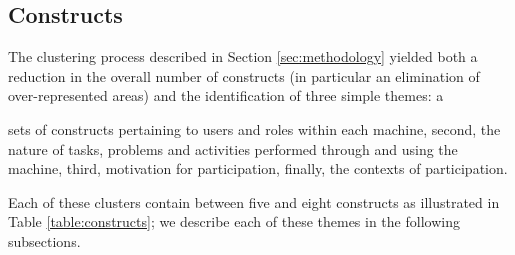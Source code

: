 \documentclass{sig-alternate}
\begin{document}
%



\subsection{Constructs}
The clustering process described in Section \ref{sec:methodology} yielded both a
reduction in the overall number of constructs (in particular an
elimination of over-represented areas) and the identification of three
simple themes: a

sets of constructs pertaining to users and roles within
each machine, second, the nature of tasks, problems and activities
performed through and using the machine, third, motivation for
participation, finally, the contexts of participation.

Each of these clusters contain between five and eight constructs as illustrated in Table
\ref{table:constructs}; we describe each of these themes in the
following subsections.
\end{document}
